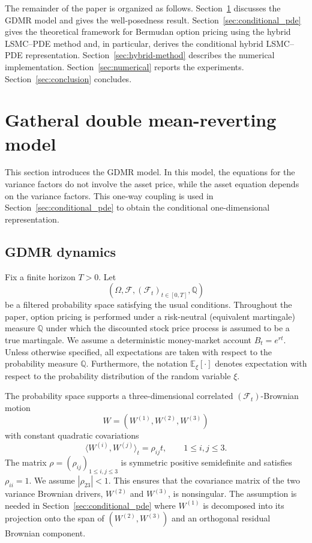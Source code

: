 \documentclass[pdflatex,sn-mathphys-num]{sn-jnl}
\theoremstyle{thmstyleone}%
\theoremstyle{thmstylethree}%
\theoremstyle{thmstyletwo}%
\newcommand{\E}{\mathbb E}
\newcommand{\Q}{\mathbb Q}
\newcommand{\F}{\mathcal F}
\begin{document}
The remainder of the paper is organized as follows. Section~\ref{sec:model}
discusses the GDMR model and gives the
well-posedness result. Section~\ref{sec:conditional_pde} gives the theoretical framework for Bermudan option pricing using the hybrid LSMC--PDE method and, in particular, derives the
conditional hybrid LSMC--PDE representation. Section~\ref{sec:hybrid-method} describes
the numerical implementation. Section~\ref{sec:numerical} reports the
experiments. Section~\ref{sec:conclusion} concludes.


\section{Gatheral double mean-reverting model}\label{sec:model}

This section introduces the GDMR model. In this model, the equations for the variance factors do not involve the asset price, while
the asset equation depends on the variance factors. This one-way coupling is
used in Section~\ref{sec:conditional_pde} to obtain the conditional
one-dimensional representation.

\subsection{GDMR dynamics}

Fix a finite horizon $T>0$. Let
$$
(\Omega,\F,(\F_t)_{t\in[0,T]},\Q)
$$
be a filtered probability space satisfying the usual conditions.  Throughout the paper, option pricing is performed under a risk-neutral (equivalent martingale) measure $\Q$ under which the discounted stock price process is assumed to be a true martingale. We assume a deterministic money-market account $B_t=e^{rt}$. Unless otherwise specified, all expectations are taken with respect to the probability measure $\Q$. Furthermore, the notation $\E_\xi[\cdot]$ denotes expectation with respect to the probability distribution of the random variable $\xi$.

The probability space supports a three-dimensional correlated $(\F_t)$-Brownian motion
$$
W=(W^{(1)},W^{(2)},W^{(3)})
$$
with constant quadratic covariations
$$
\langle W^{(i)},W^{(j)}\rangle_t=\rho_{ij}t,\qquad 1\le i,j\le 3.
$$
The matrix $\rho=(\rho_{ij})_{1\le i,j\le 3}$ is symmetric positive
semidefinite and satisfies $\rho_{ii}=1$. We assume $|\rho_{23}|<1$. This ensures that the covariance matrix of the two variance
Brownian drivers, $W^{(2)}$ and $W^{(3)}$, is nonsingular. The assumption is needed in Section~\ref{sec:conditional_pde} where $W^{(1)}$ is decomposed into its projection onto the span of
$(W^{(2)},W^{(3)})$ and an orthogonal residual Brownian component.
\end{document}

